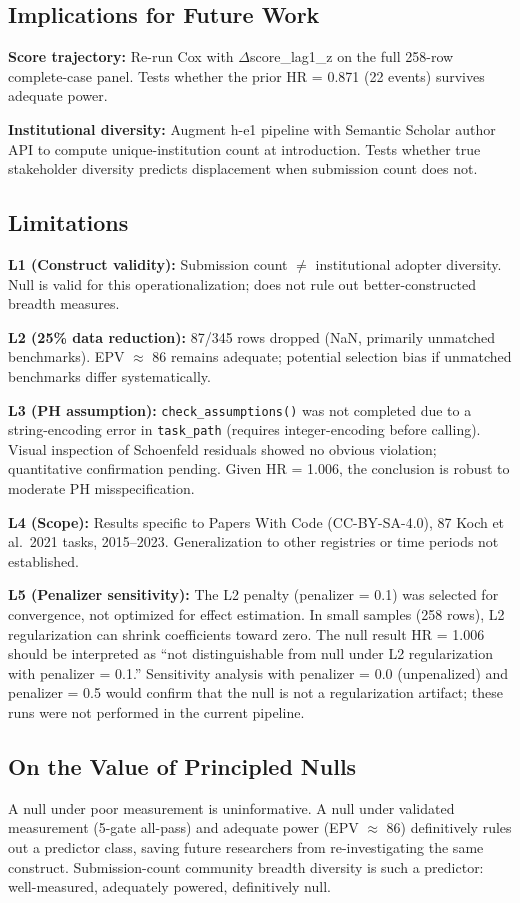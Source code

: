 \subsection{Implications for Future Work}

\textbf{Score trajectory:} Re-run Cox with $\Delta$score\_lag1\_z on the full 258-row complete-case panel. Tests whether the prior HR = 0.871 (22 events) survives adequate power.

\textbf{Institutional diversity:} Augment h-e1 pipeline with Semantic Scholar author API to compute unique-institution count at introduction. Tests whether true stakeholder diversity predicts displacement when submission count does not.

\subsection{Limitations}

\textbf{L1 (Construct validity):} Submission count $\neq$ institutional adopter diversity. Null is valid for this operationalization; does not rule out better-constructed breadth measures.

\textbf{L2 (25\% data reduction):} 87/345 rows dropped (NaN, primarily unmatched benchmarks). EPV $\approx$ 86 remains adequate; potential selection bias if unmatched benchmarks differ systematically.

\textbf{L3 (PH assumption):} \texttt{check\_assumptions()} was not completed due to a string-encoding error in \texttt{task\_path} (requires integer-encoding before calling). Visual inspection of Schoenfeld residuals showed no obvious violation; quantitative confirmation pending. Given HR = 1.006, the conclusion is robust to moderate PH misspecification.

\textbf{L4 (Scope):} Results specific to Papers With Code (CC-BY-SA-4.0), 87 Koch et al.\ 2021 tasks, 2015--2023. Generalization to other registries or time periods not established.

\textbf{L5 (Penalizer sensitivity):} The L2 penalty (penalizer = 0.1) was selected for convergence, not optimized for effect estimation. In small samples (258 rows), L2 regularization can shrink coefficients toward zero. The null result HR = 1.006 should be interpreted as ``not distinguishable from null under L2 regularization with penalizer = 0.1.'' Sensitivity analysis with penalizer = 0.0 (unpenalized) and penalizer = 0.5 would confirm that the null is not a regularization artifact; these runs were not performed in the current pipeline.

\subsection{On the Value of Principled Nulls}

A null under poor measurement is uninformative. A null under validated measurement (5-gate all-pass) and adequate power (EPV $\approx$ 86) definitively rules out a predictor class, saving future researchers from re-investigating the same construct. Submission-count community breadth diversity is such a predictor: well-measured, adequately powered, definitively null.

